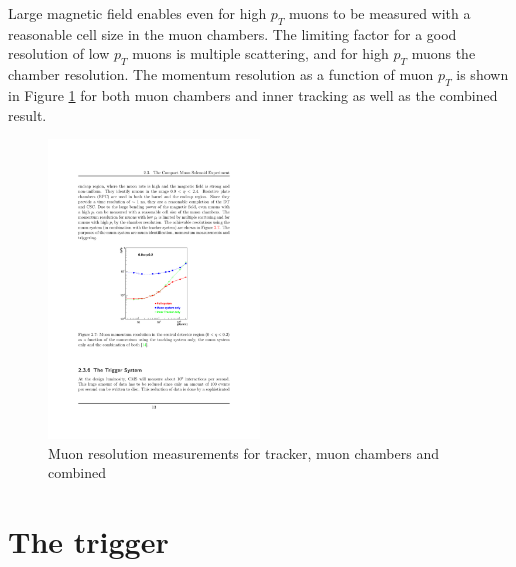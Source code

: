 \par Large magnetic field enables even for high $p_T$ muons to be measured with a reasonable cell size in the muon chambers. The limiting factor for a good resolution of low $p_T$ muons is multiple scattering, and for high $p_T$ muons the chamber resolution. The momentum resolution as a function of muon $p_T$ is shown in Figure \ref{fig:MU_pt} for both muon chambers and inner tracking as well as the combined result. 
\begin{figure}[htbp]
	\centering
		\includegraphics[width=0.5\textwidth]{Figures/MU_pt_res.pdf}
	\caption[Muon resolution measurements for tracker, muon chambers and combined]{Muon resolution measurements for tracker, muon chambers and combined \cite{Chatrchyan:2008aa}}
	\label{fig:MU_pt}
\end{figure} 



\section{The trigger}

